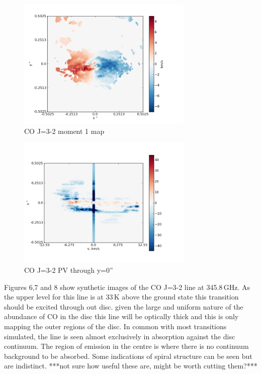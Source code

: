 \documentclass[useAMS,usenatbib]{mn2e}
\begin{document}
\begin{figure}[H]
 \includegraphics[width=84mm]{Figures/sim/imageCO_3-2_30deg_mom1.png}

 \caption{CO J=3-2 moment 1 map}
\end{figure}

\begin{figure}[H]
 \includegraphics[width=84mm]{Figures/sim/imageCO_3-2_30deg_PV_centre.png}

 \caption{CO J=3-2 PV through y=0''}
\end{figure}

Figures 6,7 and 8 show synthetic images of the CO J=3-2 line at 345.8$\,$GHz. As the upper level for this line is at 33$\,$K above the ground state this transition should be excited through out disc. given the large and uniform nature of the abundance of CO in the disc this line will be optically thick and this is only mapping the outer regions of the disc. In common with most transitions simulated, the line is seen almost exclusively in absorption against the disc continuum. The region of emission in the centre is where there is no continuum background to be absorbed.  Some indications of spiral structure can be seen but are indistinct. ***not sure how useful these are, might be worth cutting them?***\newline
\end{document}
